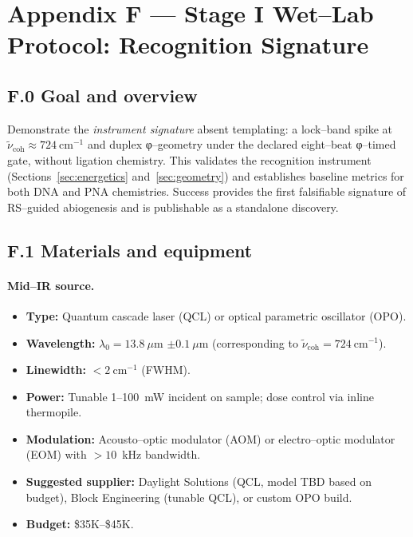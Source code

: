 \documentclass[11pt]{article}
\begin{document}
\section*{Appendix F — Stage I Wet–Lab Protocol: Recognition Signature}\label{app:stage1-protocol}

\subsection*{F.0 Goal and overview}
Demonstrate the \emph{instrument signature} absent templating: a lock–band spike at $\tilde\nu_{\mathrm{coh}}\approx 724~\mathrm{cm^{-1}}$ and duplex φ–geometry under the declared eight–beat φ–timed gate, without ligation chemistry. This validates the recognition instrument (Sections~\ref{sec:energetics} and~\ref{sec:geometry}) and establishes baseline metrics for both DNA and PNA chemistries. Success provides the first falsifiable signature of RS–guided abiogenesis and is publishable as a standalone discovery.

\subsection*{F.1 Materials and equipment}

\paragraph{Mid–IR source.}
\begin{itemize}
\item \textbf{Type:} Quantum cascade laser (QCL) or optical parametric oscillator (OPO).
\item \textbf{Wavelength:} $\lambda_0=13.8~\mu$m $\pm 0.1~\mu$m (corresponding to $\tilde\nu_{\mathrm{coh}}=724~\mathrm{cm^{-1}}$).
\item \textbf{Linewidth:} $<2~\mathrm{cm^{-1}}$ (FWHM).
\item \textbf{Power:} Tunable 1–100~mW incident on sample; dose control via inline thermopile.
\item \textbf{Modulation:} Acousto–optic modulator (AOM) or electro–optic modulator (EOM) with $>10$~kHz bandwidth.
\item \textbf{Suggested supplier:} Daylight Solutions (QCL, model TBD based on budget), Block Engineering (tunable QCL), or custom OPO build.
\item \textbf{Budget:} \$35K–\$45K.
\end{itemize}
\end{document}

